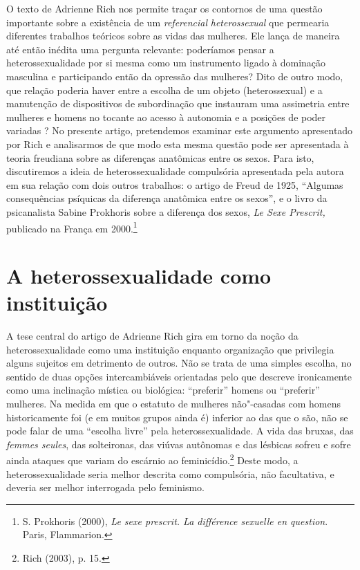 O texto de Adrienne Rich nos permite traçar os contornos de uma questão
importante sobre a existência de um \emph{referencial}
\emph{heterossexual} que permearia diferentes trabalhos teóricos sobre
as vidas das mulheres. Ele lança de maneira até então inédita uma
pergunta relevante: poderíamos pensar a heterossexualidade por si mesma
como um instrumento ligado à dominação masculina e participando então da
opressão das mulheres? Dito de outro modo, que relação poderia haver
entre a escolha de um objeto (heterossexual) e a manutenção de
dispositivos de subordinação que instauram uma assimetria entre mulheres
e homens no tocante ao acesso à autonomia e a posições de poder variadas
? No presente artigo, pretendemos examinar este argumento apresentado
por Rich e analisarmos de que modo esta mesma questão pode ser
apresentada à teoria freudiana sobre as diferenças anatômicas entre os
sexos. Para isto, discutiremos a ideia de heterossexualidade compulsória
apresentada pela autora em sua relação com dois outros trabalhos: o
artigo de Freud de 1925, ``Algumas consequências psíquicas da diferença
anatômica entre os sexos'', e o livro da psicanalista Sabine Prokhoris
sobre a diferença dos sexos, \emph{Le Sexe Prescrit,} publicado na
França em 2000.\footnote{S. Prokhoris (2000), \emph{Le sexe prescrit. La
  différence sexuelle en question}. Paris, Flammarion.}

\section{A heterossexualidade como instituição}

A tese central do artigo de Adrienne Rich gira em torno da noção da
heterossexualidade como uma instituição enquanto organização que
privilegia alguns sujeitos em detrimento de outros. Não se trata de uma
simples escolha, no sentido de duas opções intercambiáveis orientadas
pelo que descreve ironicamente como uma inclinação mística ou biológica:
``preferir'' homens ou ``preferir'' mulheres. Na medida em que o
estatuto de mulheres não"-casadas com homens historicamente foi (e em
muitos grupos ainda é) inferior ao das que o são, não se pode falar de
uma ``escolha livre'' pela heterossexualidade. A vida das bruxas, das
\emph{femmes seules}, das solteironas, das viúvas autônomas e das
lésbicas sofreu e sofre ainda ataques que variam do escárnio ao
feminicídio.\footnote{Rich (2003), p. 15.} Deste modo, a
heterossexualidade seria melhor descrita como compulsória, não
facultativa, e deveria ser melhor interrogada pelo feminismo.

